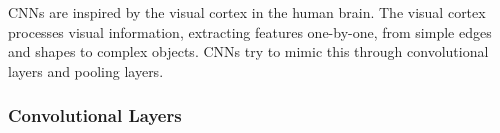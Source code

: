 \documentclass[12pt]{article}
\begin{document}
CNNs are inspired by 
the visual cortex in the human brain. 
The visual cortex processes visual information, 
extracting features one-by-one, from simple edges and shapes to complex objects.
CNNs try to mimic this 
through convolutional layers and pooling layers. 








\subsubsection*{Convolutional Layers}
\end{document}
